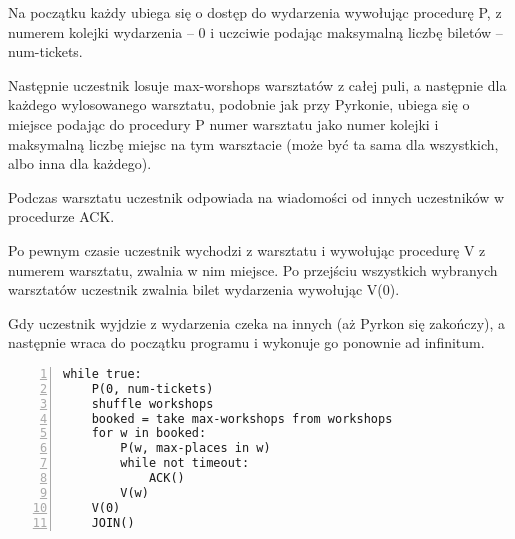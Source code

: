 \documentclass[11pt]{article}
\begin{document}
Na początku każdy ubiega się o dostęp do wydarzenia wywołując procedurę P, z numerem kolejki wydarzenia -- 0 i uczciwie podając maksymalną liczbę biletów -- num-tickets.

Następnie uczestnik losuje max-worshops warsztatów z całej puli, a następnie dla każdego wylosowanego warsztatu, podobnie jak przy Pyrkonie, ubiega się o miejsce podając do procedury P numer warsztatu jako numer kolejki i maksymalną liczbę miejsc na tym warsztacie (może być ta sama dla wszystkich, albo inna dla każdego).

Podczas warsztatu uczestnik odpowiada na wiadomości od innych uczestników w procedurze ACK.

Po pewnym czasie uczestnik wychodzi z warsztatu i wywołując procedurę V z numerem warsztatu, zwalnia w nim miejsce.
Po przejściu wszystkich wybranych warsztatów uczestnik zwalnia bilet wydarzenia wywołując V(0).

Gdy uczestnik wyjdzie z wydarzenia czeka na innych (aż Pyrkon się zakończy),
a następnie wraca do początku programu i wykonuje go ponownie ad infinitum.

\begin{Verbatim}[numbers=left,xleftmargin=5mm]
while true:
    P(0, num-tickets)
    shuffle workshops
    booked = take max-workshops from workshops
    for w in booked:
        P(w, max-places in w)
        while not timeout:
            ACK()
        V(w)
    V(0)
    JOIN()
\end{Verbatim}
\end{document}

